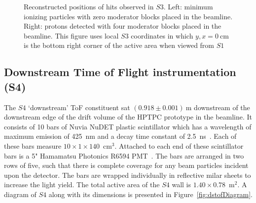 \begin{figure}[t]
  \begin{minipage}[t]{0.49\textwidth}
    \centering
    \begin{adjustbox}{max totalsize={\textwidth}{.5\textheight},center}
      
    \end{adjustbox}
  \end{minipage} 	
  \hfill
  \begin{minipage}[t]{0.49\textwidth}
    \centering
    \begin{adjustbox}{max totalsize={\textwidth}{.5\textheight},center}
      
    \end{adjustbox}
  \end{minipage}  
   \caption{ \label{fig:s3XY_pion}Reconstructed positions of hits observed in $\mathit{S3}$. Left: minimum ionizing particles with zero moderator blocks placed in the beamline. Right: protons detected with four moderator blocks placed in the beamline. This figure uses local $\mathit{S3}$ coordinates in which $y,x=0~\text{cm}$ is the bottom right corner of the active area when viewed from $\mathit{S1}$}
\end{figure}


\subsection{Downstream Time of Flight instrumentation (S4)}
\label{subsec:s4Exp}
The $\mathit{S4}$ `downstream' ToF constituent sat $(0.918 \pm 0.001)~\text{m}$ downstream of the downstream edge of the drift volume of the HPTPC prototype in the beamline.
It consists of 10 bars of Nuvia NuDET plastic scintillator which has a wavelength of maximum emission of 425~nm and a decay time constant of 2.5~ns~\cite{Nuvia}.
Each of these bars measure $10 \times 1 \times 140$~cm$^3$. 
Attached to each end of these scintillator bars is a 5" Hamamatsu Photonics R6594 PMT~\cite{Hamamatsu}.
The bars are arranged in two rows of five, such that there is complete coverage for any beam particles incident upon the detector.
The bars are wrapped individually in reflective milar sheets to increase the light yield.
The total active area of the $\mathit{S4}$ wall is $1.40 \times 0.78$~m$^2$.
A diagram of $\mathit{S4}$ along with its dimensions is presented in Figure~\ref{fig:dstofDiagram}.

